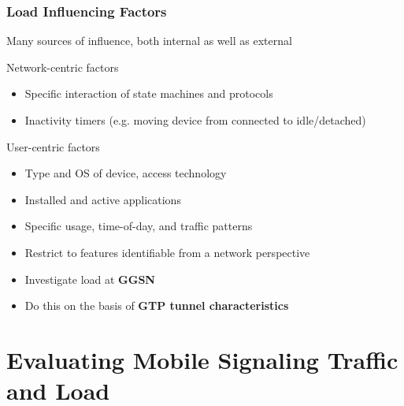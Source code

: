 \documentclass{beamer}
\begin{document}
\begin{frame}
	\frametitle{Load Influencing Factors}
	Many sources of influence, both internal as well as external

	Network-centric factors
	\begin{itemize}
		\item Specific interaction of state machines and protocols
		\item Inactivity timers (e.g. moving device from connected to idle/detached)
	\end{itemize}

	\vspace{0.3cm}
	
	User-centric factors
	\begin{itemize}
		\item Type and OS of device, access technology
		\item Installed and active applications
		\item Specific usage, time-of-day, and traffic patterns
		\item Restrict to features identifiable from a network perspective
	\end{itemize}

	\vspace{0.3cm}

	\begin{itemize}[<2->]
		\item Investigate load at \textbf{GGSN}
		\item Do this on the basis of \textbf{GTP tunnel characteristics}
	\end{itemize}

\end{frame}




\section{Evaluating Mobile Signaling Traffic and Load}
\end{document}
